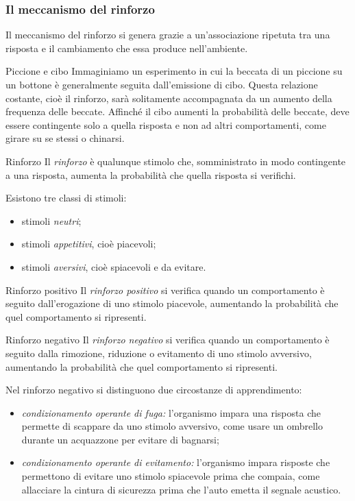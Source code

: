 \documentclass[a4paper]{article}
\begin{document}
\subsubsection{Il meccanismo del rinforzo}
Il meccanismo del rinforzo si genera grazie a un'associazione ripetuta tra una risposta e il cambiamento che essa produce nell'ambiente.
\begin{snippetexample}{Piccione e cibo}
    Immaginiamo un esperimento in cui la beccata di un piccione su un bottone è generalmente seguita dall'emissione di cibo. Questa relazione costante, cioè il rinforzo, sarà solitamente accompagnata da un aumento della frequenza delle beccate. Affinché il cibo aumenti la probabilità delle beccate, deve essere contingente solo a quella risposta e non ad altri comportamenti, come girare su se stessi o chinarsi.
\end{snippetexample}
\begin{snippetdefinition}{Rinforzo}
    Il \emph{rinforzo} è qualunque stimolo che, somministrato in modo contingente a una risposta, aumenta la probabilità che quella risposta si verifichi.
\end{snippetdefinition}
Esistono tre classi di stimoli:
\begin{itemize}
    \item stimoli \emph{neutri};
    \item stimoli \emph{appetitivi}, cioè piacevoli;
    \item stimoli \emph{aversivi}, cioè spiacevoli e da evitare.
\end{itemize}
\begin{snippetdefinition}{Rinforzo positivo}
    Il \emph{rinforzo positivo} si verifica quando un comportamento è seguito dall'erogazione di uno stimolo piacevole, aumentando la probabilità che quel comportamento si ripresenti.
\end{snippetdefinition}
\begin{snippetdefinition}{Rinforzo negativo}
    Il \emph{rinforzo negativo} si verifica quando un comportamento è seguito dalla rimozione, riduzione o evitamento di uno stimolo avversivo, aumentando la probabilità che quel comportamento si ripresenti.
\end{snippetdefinition}
Nel rinforzo negativo si distinguono due circostanze di apprendimento:
\begin{itemize}
    \item \emph{condizionamento operante di fuga:} l'organismo impara una risposta che permette di scappare da uno stimolo avversivo, come usare un ombrello durante un acquazzone per evitare di bagnarsi;
    \item \emph{condizionamento operante di evitamento:} l'organismo impara risposte che permettono di evitare uno stimolo spiacevole prima che compaia, come allacciare la cintura di sicurezza prima che l'auto emetta il segnale acustico.
\end{itemize}
\end{document}
